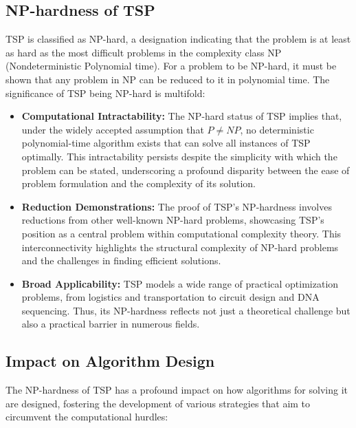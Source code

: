 \subsection{NP-hardness of TSP}

TSP is classified as NP-hard, a designation indicating that the problem is at least as hard as the most difficult problems in the complexity class NP (Nondeterministic Polynomial time). For a problem to be NP-hard, it must be shown that any problem in NP can be reduced to it in polynomial time. The significance of TSP being NP-hard is multifold:

\begin{itemize}
    \item \textbf{Computational Intractability:} The NP-hard status of TSP implies that, under the widely accepted assumption that $P \neq NP$, no deterministic polynomial-time algorithm exists that can solve all instances of TSP optimally. This intractability persists despite the simplicity with which the problem can be stated, underscoring a profound disparity between the ease of problem formulation and the complexity of its solution.
    \item \textbf{Reduction Demonstrations:} The proof of TSP's NP-hardness involves reductions from other well-known NP-hard problems, showcasing TSP's position as a central problem within computational complexity theory. This interconnectivity highlights the structural complexity of NP-hard problems and the challenges in finding efficient solutions.
    \item \textbf{Broad Applicability:} TSP models a wide range of practical optimization problems, from logistics and transportation to circuit design and DNA sequencing. Thus, its NP-hardness reflects not just a theoretical challenge but also a practical barrier in numerous fields.
\end{itemize}

\subsection{Impact on Algorithm Design}

The NP-hardness of TSP has a profound impact on how algorithms for solving it are designed, fostering the development of various strategies that aim to circumvent the computational hurdles:

